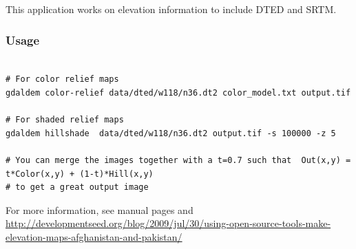 This application works on elevation information to include DTED and SRTM.

\subsubsection*{Usage}
\begin{verbatim}

# For color relief maps
gdaldem color-relief data/dted/w118/n36.dt2 color_model.txt output.tif

# For shaded relief maps
gdaldem hillshade  data/dted/w118/n36.dt2 output.tif -s 100000 -z 5

# You can merge the images together with a t=0.7 such that  Out(x,y) = t*Color(x,y) + (1-t)*Hill(x,y)
# to get a great output image
\end{verbatim}
For more information, see manual pages and \url{http://developmentseed.org/blog/2009/jul/30/using-open-source-tools-make-elevation-maps-afghanistan-and-pakistan/}

